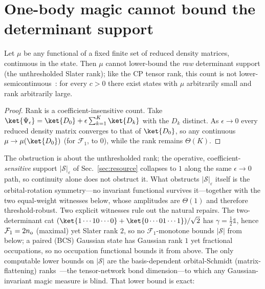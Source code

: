 \section{One-body magic cannot bound the determinant support}
\label{app:theorem}
\begin{proposition}
\label{prop:obstruction}
Let $\mu$ be any functional of a fixed finite set of reduced density matrices, continuous in the
state. Then $\mu$ cannot lower-bound the \emph{raw} determinant support (the unthresholded Slater rank);
like the CP tensor rank, this count is not lower-semicontinuous~\cite{desilvalim2008}: for every $c>0$ there exist states with $\mu$ arbitrarily small and rank arbitrarily large.
\end{proposition}
\begin{proof}
Rank is a coefficient-insensitive count. Take
$\ket{\Psi_\epsilon}=\ket{D_0}+\epsilon\sum_{k=1}^{K}\ket{D_k}$ with the $D_k$ distinct. As
$\epsilon\to0$ every reduced density matrix converges to that of $\ket{D_0}$, so any continuous
$\mu\to\mu(\ket{D_0})$ (for $\mathcal F_1$, to $0$), while the rank remains $\Theta(K)$.
\end{proof}
\noindent The obstruction is about the unthresholded rank; the operative, coefficient-\emph{sensitive}
support $|\mathcal S|_\varepsilon$ of Sec.~\ref{sec:resource} collapses to $1$ along the same
$\epsilon\to0$ path, so continuity alone does not obstruct it. What obstructs $|\mathcal S|_\varepsilon$
itself is the orbital-rotation symmetry---no invariant functional survives it---together with the two
equal-weight witnesses below, whose amplitudes are $\Theta(1)$ and therefore threshold-robust.
Two explicit witnesses rule out the natural repairs. The two-determinant cat
$(\ket{1\cdots10\cdots0}+\ket{0\cdots01\cdots1})/\sqrt2$ has $\gamma=\tfrac12\mathbb 1$, hence
$\mathcal F_1=2n_{\rm o}$ (maximal) yet Slater rank $2$, so no $\mathcal F_1$-monotone bounds $|\mathcal S|$
from below; a paired (BCS) Gaussian state has Gaussian rank $1$ yet fractional occupations, so no
occupation functional bounds it from above. The only computable lower bounds on $|\mathcal S|$ are the
basis-dependent orbital-Schmidt (matrix-flattening) ranks~\cite{schollwock2011}---the tensor-network
bond dimension---to which any Gaussian-invariant magic measure is blind. That lower bound is exact:


